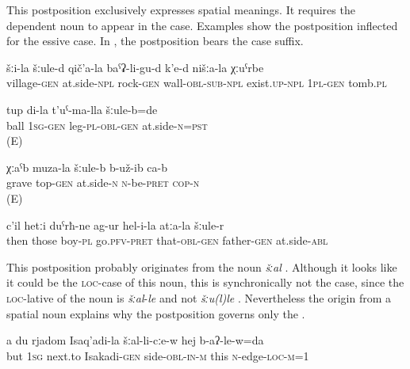 This postposition exclusively expresses spatial meanings. It requires the dependent noun to appear in the  case. Examples  show the postposition inflected for the essive case. In , the postposition bears the  case suffix.
%
\begin{exe}
	\ex
	\begin{xlist}
		\ex	\label{Next to the village under a stone wall there is our graveyard}
		\gll	šːi-la	šːule-d	qič'a-la	baˁʡ-li-gu-d	k'e-d	nišːa-la	χːuˁrbe  \\
			village-\textsc{gen}	at.side-\textsc{npl}	rock-\textsc{gen}	wall-\textsc{obl}-\textsc{sub}-\textsc{npl}	exist.\textsc{up-npl}	1\textsc{pl}-\textsc{gen}	tomb.\textsc{pl}\\
		\glt	{}

						\ex	\label{The ball was at my feet.}
		\gll	tup di-la t'uˁ-ma-lla šːule-b=de \\
ball	\textsc{1sg-gen}	leg-\textsc{pl-obl-gen}	at.side-\textsc{n=pst} 	\\
		\glt	{}	(E)		
		
			\ex	\label{The grave was near the top.}
		\gll	χːaˁb muza-la šːule-b b-už-ib ca-b \\
grave	top-\textsc{gen}	at.side-\textsc{n}	\textsc{n}-be-\textsc{pret}	\textsc{cop-n}\\
		\glt	{}	(E)
		
		\ex	\label{Then these boys passed by from his, the father's, side}
		\gll	c'il	hetːi	duˁrħ-ne	ag-ur	hel-i-la	atːa-la šːule-r\\
			then	those	boy-\textsc{pl}	go.\textsc{pfv}-\textsc{pret}	that-\textsc{obl}-\textsc{gen}	father-\textsc{gen} at.side-\textsc{abl}\\
		\glt	{}
		
	\end{xlist}
\end{exe}

This postposition probably originates from the noun \textit{šːal} . Although it looks like it could be the \textsc{loc}-case of this noun, this is synchronically not the case, since the \textsc{loc}-lative of the noun is \textit{šːal}-\textit{le} and not \textit{šːu(l)le} . Nevertheless the origin from a spatial noun explains why the postposition governs only the .
%
\begin{exe}
	\ex	\label{And I am at the side of Isakadi, at this end}
	\gll	a	du	rjadom	Isaq'adi-la	šːal-li-cːe-w	hej	b-aʔ-le-w=da \\
		but	1\textsc{sg}	next.to	Isakadi-\textsc{gen}	side-\textsc{obl}-\textsc{in}-\textsc{m}	this	\textsc{n}-edge-\textsc{loc}-\textsc{m}=1\\
	\glt	{}
\end{exe}


